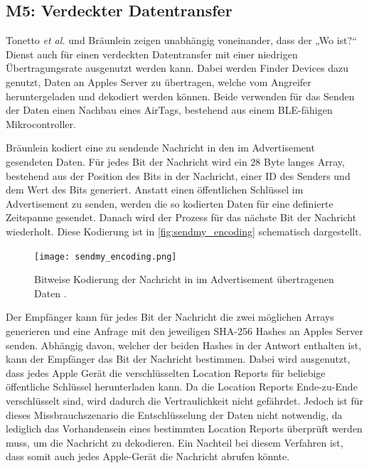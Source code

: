 \subsection{M5: Verdeckter Datentransfer}
\label{missbrauch:5}
Tonetto \textit{et al.} \cite{Tonetto_FindMy} und Bräunlein \cite{braeunlein_sendmy} zeigen unabhängig voneinander, dass der „Wo ist?“ Dienst auch für einen verdeckten Datentransfer mit einer niedrigen Übertragungsrate ausgenutzt werden kann.
Dabei werden Finder Devices dazu genutzt, Daten an Apples Server zu übertragen, welche vom Angreifer heruntergeladen und dekodiert werden können.
Beide verwenden für das Senden der Daten einen Nachbau eines AirTags, bestehend aus einem \ac{BLE}-fähigen Mikrocontroller.

Bräunlein \cite{braeunlein_sendmy} kodiert eine zu sendende Nachricht in den im Advertisement gesendeten Daten.
Für jedes Bit der Nachricht wird ein 28 Byte langes Array, bestehend aus der Position des Bits in der Nachricht, einer ID des Senders und dem Wert des Bits generiert.
Anstatt einen öffentlichen Schlüssel im Advertisement zu senden, werden die so kodierten Daten für eine definierte Zeitspanne gesendet.
Danach wird der Prozess für das nächste Bit der Nachricht wiederholt.
Diese Kodierung ist in \autoref{fig:sendmy_encoding} schematisch dargestellt.
\begin{figure}[ht]
  \centering
  \texttt{[image: sendmy\_encoding.png]}
  \caption{Bitweise Kodierung der Nachricht in im Advertisement übertragenen Daten \cite{braeunlein_sendmy}.}
  \label{fig:sendmy_encoding}
\end{figure}
Der Empfänger kann für jedes Bit der Nachricht die zwei möglichen Arrays generieren und eine Anfrage mit den jeweiligen \ac{SHA}-256 Hashes an Apples Server senden.
Abhängig davon, welcher der beiden Hashes in der Antwort enthalten ist, kann der Empfänger das Bit der Nachricht bestimmen.
Dabei wird ausgenutzt, dass jedes Apple Gerät die verschlüsselten Location Reports für beliebige öffentliche Schlüssel herunterladen kann.
Da die Location Reports Ende-zu-Ende verschlüsselt sind, wird dadurch die Vertraulichkeit nicht gefährdet.
Jedoch ist für dieses Missbrauchszenario die Entschlüsselung der Daten nicht notwendig, da lediglich das Vorhandensein eines bestimmten Location Reports überprüft werden muss, um die Nachricht zu dekodieren.
Ein Nachteil bei diesem Verfahren ist, dass somit auch jedes Apple-Gerät die Nachricht abrufen könnte.


